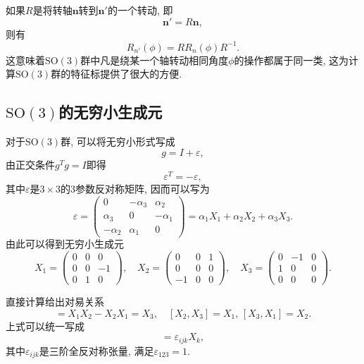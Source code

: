 \documentclass[UTF8]{ctexart}
\begin{document}
如果$R$是将转轴$\bm{n}$转到$\bm{n}'$的一个转动, 即
\begin{equation}
  \bm{n}' = R \bm{n},
\end{equation}
则有
\begin{equation}
  R_{n'}(\phi) = R R_n(\phi) R^{-1}.
\end{equation}
这意味着$\mathrm{SO}(3)$群中凡是绕某一个轴转动相同角度$\phi$的操作都属于同一类, 这为计算$\mathrm{SO}(3)$群的特征标提供了很大的方便.

\subsection{$\mathrm{SO}(3)$的无穷小生成元}
对于$\mathrm{SO}(3)$群, 可以将无穷小形式写成
\begin{equation}
  g = I + \varepsilon,
\end{equation}
由正交条件$g^Tg = I$即得
\begin{equation}
  \varepsilon^T = - \varepsilon,
\end{equation}
其中$\varepsilon$是$3 \times 3$的3参数反对称矩阵, 因而可以写为
\begin{equation}
  \varepsilon =
  \begin{pmatrix}
    0 & -\alpha_3 & \alpha_2 \\
    \alpha_3 & 0 & -\alpha_1 \\
    -\alpha_2 & \alpha_1 & 0
  \end{pmatrix} = \alpha_1 X_1 + \alpha_2 X_2 + \alpha_3 X_3.
\end{equation}
由此可以得到无穷小生成元
\begin{equation}
  X_1 =
  \begin{pmatrix}
    0 & 0 & 0 \\
    0 & 0 & -1 \\
    0 & 1 & 0
  \end{pmatrix}, \quad X_2 =
  \begin{pmatrix}
    0 & 0 & 1 \\
    0 & 0 & 0 \\
    -1 & 0 & 0
  \end{pmatrix}, \quad X_3 =
  \begin{pmatrix}
    0 & -1 & 0 \\
    1 & 0 & 0 \\
    0 & 0 & 0
  \end{pmatrix}.
\end{equation}

直接计算给出对易关系
\begin{equation}
  [X_1, X_2] = X_1 X_2 - X_2 X_1 = X_3, \quad [X_2,X_3]=X_1, \, [X_3,X_1] = X_2.
\end{equation}
上式可以统一写成
\begin{equation}
  [X_i,X_j] = \varepsilon_{ijk}X_k,
\end{equation}
其中$\varepsilon_{ijk}$是三阶全反对称张量, 满足$\varepsilon_{123} = 1$.
\end{document}
